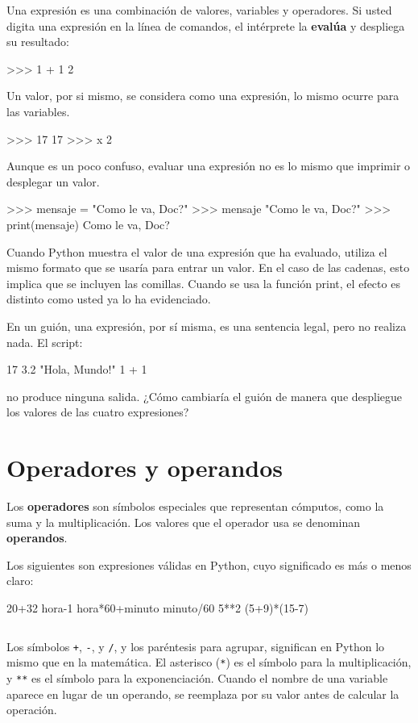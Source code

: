 Una expresión es una combinación de valores, variables y operadores.
Si usted digita una expresión en la línea de comandos, el intérprete
la \textbf{evalúa} y despliega su resultado:

\begin{pyconcode}
>>> 1 + 1
2
\end{pyconcode}
 

Un valor, por si mismo, se considera como una expresión, lo mismo
ocurre para las variables.

\begin{pyconcode}
>>> 17
17
>>> x
2
\end{pyconcode}
 

Aunque es un poco confuso, evaluar una expresión no es lo mismo que
imprimir o desplegar un valor.

\begin{pyconcode}
>>> mensaje = "Como le va, Doc?"
>>> mensaje
"Como le va, Doc?"
>>> print(mensaje)
Como le va, Doc?
\end{pyconcode}
 

Cuando Python muestra el valor de una expresión que ha evaluado, utiliza
el mismo formato que se usaría para entrar un valor. En el caso de
las cadenas, esto implica que se incluyen las comillas. Cuando se
usa la función print, el efecto es distinto como usted ya lo ha evidenciado.

En un guión, una expresión, por sí misma, es una sentencia legal,
pero no realiza nada. El script:

\begin{pythoncode}
17
3.2
"Hola, Mundo!"
1 + 1
\end{pythoncode}
 

no produce ninguna salida. ¿Cómo cambiaría el guión de manera que
despliegue los valores de las cuatro expresiones?

\section{Operadores y operandos}

  

Los \textbf{operadores} son símbolos especiales que representan cómputos,
como la suma y la multiplicación. Los valores que el operador usa
se denominan \textbf{operandos}.

Los siguientes son expresiones válidas en Python, cuyo significado
es más o menos claro: 

\begin{pythoncode}
20+32       hora-1   hora*60+minuto   
minuto/60   5**2     (5+9)*(15-7)
\end{pythoncode}
\begin{verbatim}

\end{verbatim}
Los símbolos \texttt{+}, \texttt{-}, y \texttt{/}, y los paréntesis
para agrupar, significan en Python lo mismo que en la matemática.
El asterisco (\texttt{{*}}) es el símbolo para la multiplicación,
y \texttt{{*}{*}} es el símbolo para la exponenciación. Cuando el
nombre de una variable aparece en lugar de un operando, se reemplaza
por su valor antes de calcular la operación.

